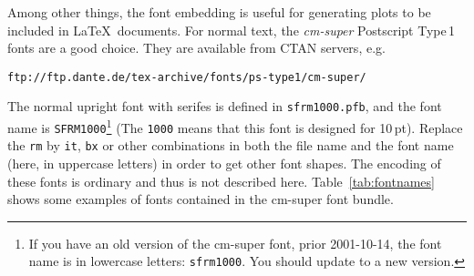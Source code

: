 \documentclass[a4paper,10pt]{article}
\begin{document}
Among other things, the font embedding is useful for generating plots
to be included in \LaTeX\ documents. 
For normal text, the \emph{cm-super} Postscript Type\,1 fonts are a
good choice. 
They are available from CTAN servers, e.g.
\begin{verbatim}
ftp://ftp.dante.de/tex-archive/fonts/ps-type1/cm-super/
\end{verbatim}
The normal upright font with serifes is defined in
\verb|sfrm1000.pfb|, and the font name is \verb|SFRM1000|\footnote{If you
  have an old version of the cm-super font, prior 2001-10-14, the font
  name is in lowercase letters: \texttt{sfrm1000}. You should update
  to a new version.} (The \verb|1000| means that this font is designed
for 10\,pt).
Replace the \verb|rm| by \verb|it|, \verb|bx| or other combinations in
both the file name and the font name (here, in uppercase letters) in order 
to get other font shapes.
The encoding of these fonts is ordinary and thus is not described
here.
Table~\ref{tab:fontnames} shows some examples of fonts contained in
the cm-super font bundle.
%
\end{document}
